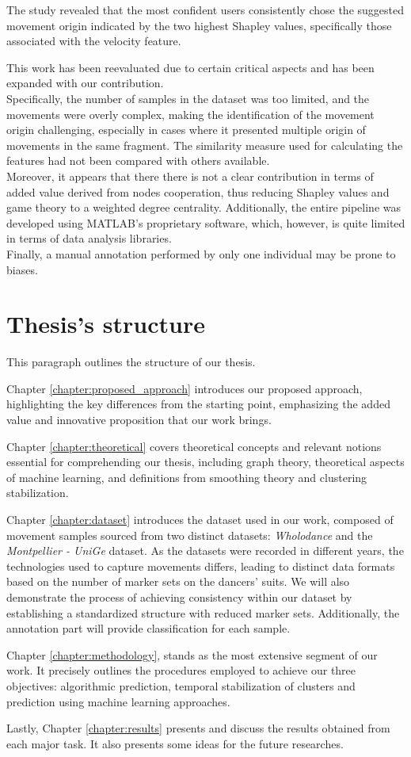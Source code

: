 The study revealed that the most confident users consistently chose the suggested movement origin indicated by the two highest Shapley values, specifically those associated with the velocity feature.

This work has been reevaluated due to certain critical aspects and has been expanded with our contribution.\\
Specifically, the number of samples in the dataset was too limited, and the movements were overly complex, making the identification of the movement origin challenging, especially in cases where it presented multiple origin of movements in the same fragment.
The similarity measure used for calculating the features had not been compared with others available. \\
Moreover, it appears that there there is not a clear contribution in terms of added value derived from nodes cooperation, thus reducing Shapley values and game theory to a weighted degree centrality.
Additionally, the entire pipeline was developed using MATLAB's proprietary software, which, however, is quite limited in terms of data analysis libraries.\\
Finally, a manual annotation performed by only one individual may be prone to biases.


\section{Thesis's structure}
This paragraph outlines the structure of our thesis. 

Chapter \ref{chapter:proposed_approach} introduces our proposed approach, highlighting the key differences from the starting point, emphasizing the added value and innovative proposition that our work brings. 

Chapter \ref{chapter:theoretical} covers theoretical concepts and relevant notions essential for comprehending our thesis, including graph theory, theoretical aspects of machine learning, and definitions from smoothing theory and clustering stabilization. 

Chapter \ref{chapter:dataset} introduces the dataset used in our work, composed of movement samples sourced from two distinct datasets: \textit{Wholodance} and the \textit{Montpellier - UniGe} dataset.
As the datasets were recorded in different years, the technologies used to capture movements differs, leading to distinct data formats based on the number of marker sets on the dancers' suits.
We will also demonstrate the process of achieving consistency within our dataset by establishing a standardized structure with reduced marker sets.
Additionally, the annotation part will provide classification for each sample. 

Chapter \ref{chapter:methodology}, stands as the most extensive segment of our work.
It precisely outlines the procedures employed to achieve our three objectives: algorithmic prediction, temporal stabilization of clusters and prediction using machine learning approaches.

Lastly, Chapter \ref{chapter:results} presents and discuss the results obtained from each major task. It also presents some ideas for the future researches.